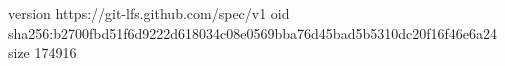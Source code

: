 version https://git-lfs.github.com/spec/v1
oid sha256:b2700fbd51f6d9222d618034c08e0569bba76d45bad5b5310dc20f16f46e6a24
size 174916
